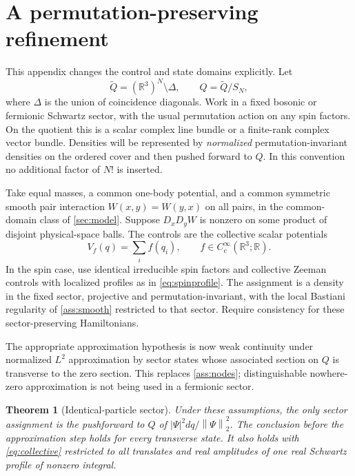 \documentclass[11pt]{article}
\numberwithin{equation}{section}
\newtheorem{theorem}{Theorem}[section]
\theoremstyle{definition}
\newcommand{\R}{\mathbb R}
\newcommand{\Cc}{C_c^\infty}
\newcommand{\norm}[1]{\left\|#1\right\|}
\begin{document}
\section{A permutation-preserving refinement}\label{app:identical}

This appendix changes the control and state domains explicitly. Let
\[
 \widetilde Q=(\R^3)^N\setminus\Delta,\qquad
 Q=\widetilde Q/S_N,
\]
where \(\Delta\) is the union of coincidence diagonals. Work in a fixed bosonic or fermionic Schwartz sector, with the usual permutation action on any spin factors. On the quotient this is a scalar complex line bundle or a finite-rank complex vector bundle. Densities will be represented by \emph{normalized} permutation-invariant densities on the ordered cover and then pushed forward to \(Q\). In this convention no additional factor of \(N!\) is inserted.

Take equal masses, a common one-body potential, and a common symmetric smooth pair interaction \(W(x,y)=W(y,x)\) on all pairs, in the common-domain class of \cref{sec:model}. Suppose \(D_xD_yW\) is nonzero on some product of disjoint physical-space balls. The controls are the collective scalar potentials
\begin{equation}\label{eq:collective}
 V_f(q)=\sum_i f(q_i),\qquad f\in\Cc(\R^3;\R).
\end{equation}
In the spin case, use identical irreducible spin factors and collective Zeeman controls with localized profiles as in \cref{eq:spinprofile}. The assignment is a density in the fixed sector, projective and permutation-invariant, with the local Bastiani regularity of \ref{ass:smooth} restricted to that sector. Require consistency for these sector-preserving Hamiltonians.

The appropriate approximation hypothesis is now weak continuity under normalized \(L^2\) approximation by sector states whose associated section on \(Q\) is transverse to the zero section. This replaces \ref{ass:nodes}; distinguishable nowhere-zero approximation is not being used in a fermionic sector.

\begin{theorem}[Identical-particle sector]\label{thm:identical}
Under these assumptions, the only sector assignment is the pushforward to \(Q\) of \(|\Psi|^2dq/\norm{\Psi}_2^2\). The conclusion before the approximation step holds for every transverse state. It also holds with \eqref{eq:collective} restricted to all translates and real amplitudes of one real Schwartz profile of nonzero integral.
\end{theorem}
\end{document}
